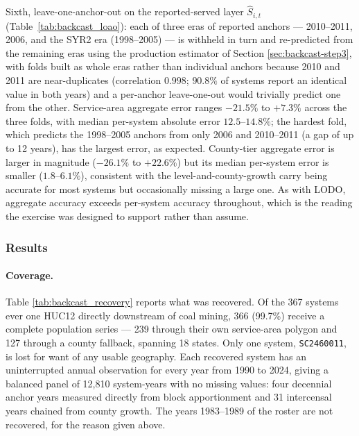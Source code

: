 Sixth, leave-one-anchor-out on the reported-served layer $\hat S_{i,t}$
(Table~\ref{tab:backcast_loao}): each of three eras of reported anchors ---
2010--2011, 2006, and the SYR2 era (1998--2005) --- is withheld in turn and
re-predicted from the remaining eras using the production estimator of Section
\ref{sec:backcast-step3}, with folds built as whole eras rather than individual
anchors because 2010 and 2011 are near-duplicates (correlation $0.998$; $90.8\%$
of systems report an identical value in both years) and a per-anchor
leave-one-out would trivially predict one from the other. Service-area
aggregate error ranges $-21.5\%$ to $+7.3\%$ across the three folds, with median
per-system absolute error $12.5$--$14.8\%$; the hardest fold, which predicts the
1998--2005 anchors from only 2006 and 2010--2011 (a gap of up to 12 years), has
the largest error, as expected. County-tier aggregate error is larger in
magnitude ($-26.1\%$ to $+22.6\%$) but its median per-system error is smaller
($1.8$--$6.1\%$), consistent with the level-and-county-growth carry being
accurate for most systems but occasionally missing a large one. As with LODO,
aggregate accuracy exceeds per-system accuracy throughout, which is the reading
the exercise was designed to support rather than assume.



\subsubsection{Results}

\paragraph{Coverage.}
Table \ref{tab:backcast_recovery} reports what was recovered. Of the 367 systems
ever one HUC12 directly downstream of coal mining, 366 (99.7\%) receive a
complete population series --- 239 through their own service-area polygon and 127
through a county fallback, spanning 18 states. Only one system, \texttt{SC2460011},
is lost for want of any usable geography. Each recovered system has an
uninterrupted annual observation for every year from 1990 to 2024, giving a
balanced panel of 12,810 system-years with no missing values: four decennial
anchor years measured directly from block apportionment and 31 intercensal years
chained from county growth. The years 1983--1989 of the roster are not recovered,
for the reason given above.



